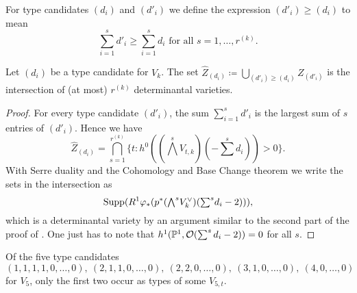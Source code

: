 \begin{definition}
	For type candidates $(d_i)$ and $(d'_i)$ we define the expression $(d'_i) \geq (d_i)$ to mean
	\[
		\sum_{i=1}^s d'_i \geq \sum_{i=1}^s d_i \text{ for all $s=1,\dotsc, r^{(k)}$}.
	\]
\end{definition}

\begin{proposition}
	Let $(d_i)$ be a type candidate for $V_k$. The set $\widehat Z_{(d_i)} \coloneqq \bigcup_{(d'_i)\geq(d_i)} Z_{(d'_i)}$ is the intersection of (at most) $r^{(k)}$ determinantal varieties.
\end{proposition}

\begin{proof}
	For every type candidate $(d'_i)$, the sum $\sum_{i=1}^s d'_i$ is the largest sum of $s$ entries of $(d'_i)$.  Hence we have 
	\[
		\widehat Z_{(d_i)} = \bigcap_{s=1}^{r^{(k)}} \{t : h^0((\textstyle{\bigwedge}^{s} V_{t,k})(-\textstyle{\sum}^s d_i)) > 0\}.
	\]
	With Serre duality and the Cohomology and Base Change theorem we write the sets in the intersection as 
	\[
		\operatorname{Supp}(R^1 \varphi_{*} (p^{*} (\textstyle{\bigwedge}^{s} V_k^\vee )(\textstyle{\sum}^s d_i - 2))),
	\]
	which is a determinantal variety by an argument similar to the second part of the proof of . One just has to note that $h^1(\mathbb{P}^1,\mathcal{O}(\sum^s d_i - 2)) = 0$ for all $s$.
\end{proof}

\begin{proposition}
Of the five type candidates
\[
(1,1,1,1,0,\dotsc,0),\ (2,1,1,0,\dotsc,0),\ (2,2,0,\dotsc,0),\ (3,1,0,\dotsc,0),\ (4,0,\dotsc,0)
\]
for $V_5$, only the first two occur as types of some $V_{5,t}$.
\end{proposition}


